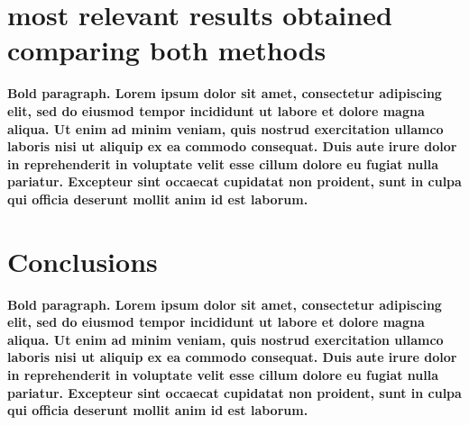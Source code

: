 \documentclass{llncs}
\begin{document}
\section{most relevant results obtained comparing both methods}

\textbf{Bold paragraph. Lorem ipsum dolor sit amet, consectetur adipiscing elit, sed do eiusmod tempor incididunt ut labore et dolore magna aliqua. Ut enim ad minim veniam, quis nostrud exercitation ullamco laboris nisi ut aliquip ex ea commodo consequat. Duis aute irure dolor in reprehenderit in voluptate velit esse cillum dolore eu fugiat nulla pariatur. Excepteur sint occaecat cupidatat non proident, sunt in culpa qui officia deserunt mollit anim id est laborum.}
 
 
 \section{Conclusions}
 
 \textbf{Bold paragraph. Lorem ipsum dolor sit amet, consectetur adipiscing elit, sed do eiusmod tempor incididunt ut labore et dolore magna aliqua. Ut enim ad minim veniam, quis nostrud exercitation ullamco laboris nisi ut aliquip ex ea commodo consequat. Duis aute irure dolor in reprehenderit in voluptate velit esse cillum dolore eu fugiat nulla pariatur. Excepteur sint occaecat cupidatat non proident, sunt in culpa qui officia deserunt mollit anim id est laborum.}
\end{document}
